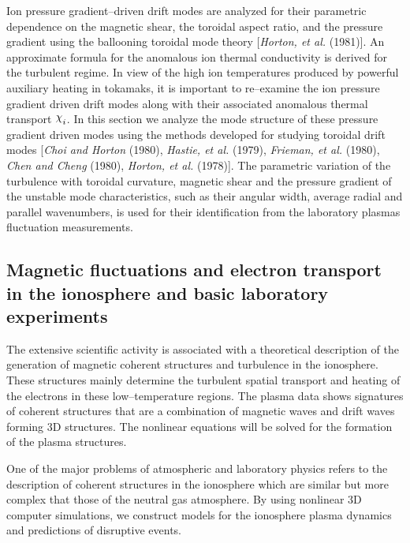\documentclass[a4paper,openany,12pt]{report}
\def\chix{\raise.5ex\hbox{$\chi$}}
\begin{document}
Ion pressure gradient--driven drift modes are analyzed for their parametric dependence on the magnetic shear, the toroidal aspect ratio, and the pressure gradient using the ballooning toroidal mode theory [\emph{Horton, et al.} (1981)]. An approximate formula for the anomalous ion thermal conductivity is derived for the turbulent regime. In view of the 
high ion temperatures produced by powerful auxiliary heating in tokamaks, it is important to re--examine the ion pressure gradient driven drift modes along with their associated anomalous thermal transport $\chix_i$. In this section we analyze the mode structure of these pressure gradient driven modes using the methods developed for studying toroidal drift modes [\emph{Choi and Horton} (1980), \emph{Hastie, et al.} (1979), \emph{Frieman, et al.} (1980), \emph{Chen and Cheng} (1980), \emph{Horton, et al.} (1978)]. The parametric variation of the turbulence with toroidal curvature, magnetic shear and the pressure gradient of the unstable mode characteristics, such as their angular width, average radial and parallel wavenumbers, is used for their identification from the laboratory plasmas fluctuation measurements.

\subsection{Magnetic fluctuations and electron transport in the ionosphere and basic laboratory experiments}

The extensive scientific activity is associated with a theoretical description of the generation of magnetic coherent structures and turbulence in the ionosphere. These structures mainly determine the turbulent spatial transport and heating of the electrons in these low--temperature regions. The plasma data shows signatures of coherent structures that are a combination of magnetic waves and drift waves forming 3D structures. The nonlinear equations will be solved for the formation of the plasma structures. 

One of the major problems of atmospheric and laboratory physics refers to the description of coherent structures in the ionosphere which are similar but more complex that those of the neutral gas atmosphere. By using nonlinear 3D computer simulations, we construct models for the ionosphere plasma dynamics and predictions of disruptive events. 
\end{document}
